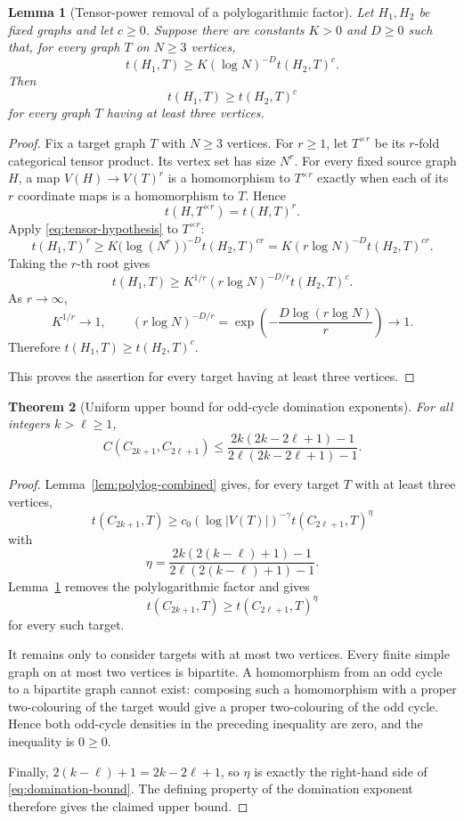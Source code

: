 \documentclass[11pt]{article}
\newtheorem{theorem}{Theorem}[section]
\newtheorem{lemma}[theorem]{Lemma}
\newcommand{\1}{\mathbf{1}}
\begin{document}
\begin{lemma}[Tensor-power removal of a polylogarithmic factor]
\label{lem:tensor-trick}
Let $H_1,H_2$ be fixed graphs and let $c\ge0$.  Suppose there are constants
$K>0$ and $D\ge0$ such that, for every graph $T$ on $N\ge3$ vertices,
\[
  t(H_1,T)\ge K(\log N)^{-D}t(H_2,T)^c.
  \tag{7.28}\label{eq:tensor-hypothesis}
\]
Then
\[
  t(H_1,T)\ge t(H_2,T)^c
\]
for every graph $T$ having at least three vertices.
\end{lemma}

\begin{proof}
Fix a target graph $T$ with $N\ge3$ vertices.  For $r\ge1$, let
$T^{\times r}$ be its $r$-fold categorical tensor product.  Its vertex set has
size $N^r$.  For every fixed source graph $H$, a map
$V(H)\to V(T)^r$ is a homomorphism to $T^{\times r}$ exactly when each of its
$r$ coordinate maps is a homomorphism to $T$.  Hence
\[
  t(H,T^{\times r})=t(H,T)^r.
  \tag{7.29}\label{eq:tensor-density}
\]
Apply \eqref{eq:tensor-hypothesis} to $T^{\times r}$:
\[
  t(H_1,T)^r
  \ge
  K\bigl(\log(N^r)\bigr)^{-D}t(H_2,T)^{cr}
  =K(r\log N)^{-D}t(H_2,T)^{cr}.
\]
Taking the $r$-th root gives
\[
  t(H_1,T)
  \ge
  K^{1/r}(r\log N)^{-D/r}t(H_2,T)^c.
\]
As $r\to\infty$,
\[
  K^{1/r}\longrightarrow1,
  \qquad
  (r\log N)^{-D/r}
  =\exp\left(-\frac{D\log(r\log N)}{r}\right)
  \longrightarrow1.
\]
Therefore $t(H_1,T)\ge t(H_2,T)^c$.

This proves the assertion for every target having at least three vertices.
\end{proof}

\begin{theorem}[Uniform upper bound for odd-cycle domination exponents]
\label{thm:domination-bound}
For all integers $k>\ell\ge1$,
\[
  C(C_{2k+1},C_{2\ell+1})
  \le
  \frac{2k(2k-2\ell+1)-1}
       {2\ell(2k-2\ell+1)-1}.
  \tag{7.30}\label{eq:domination-bound}
\]
\end{theorem}

\begin{proof}
Lemma~\ref{lem:polylog-combined} gives, for every target $T$ with at least
three vertices,
\[
  t(C_{2k+1},T)
  \ge
  c_0(\log |V(T)|)^{-\gamma}
  t(C_{2\ell+1},T)^\eta
\]
with
\[
  \eta
  =
  \frac{2k(2(k-\ell)+1)-1}
       {2\ell(2(k-\ell)+1)-1}.
\]
Lemma~\ref{lem:tensor-trick} removes the polylogarithmic factor and gives
\[
  t(C_{2k+1},T)\ge t(C_{2\ell+1},T)^\eta
\]
for every such target.

It remains only to consider targets with at most two vertices.  Every finite
simple graph on at most two vertices is bipartite.  A homomorphism from an odd
cycle to a bipartite graph cannot exist: composing such a homomorphism with a
proper two-colouring of the target would give a proper two-colouring of the
odd cycle.  Hence both odd-cycle densities in the preceding inequality are
zero, and the inequality is $0\ge0$.

Finally, $2(k-\ell)+1=2k-2\ell+1$, so $\eta$ is exactly the right-hand side of
\eqref{eq:domination-bound}.  The defining property of the domination exponent
therefore gives the claimed upper bound.
\end{proof}
\end{document}
